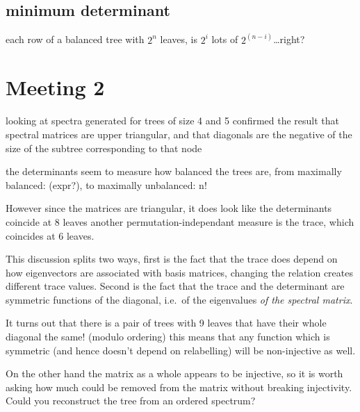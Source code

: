 \documentclass{report}
\begin{document}
\subsection{minimum determinant}

each row of a balanced tree with $2^n$ leaves, is $2^i$ lots of $2^(n-i)$\ldots right?

\section{Meeting 2}


looking at spectra generated for trees of size 4 and 5 confirmed the result
that spectral matrices are upper triangular, and that diagonals are the
negative of the size of the subtree corresponding to that node

the determinants seem to measure how balanced the trees are, from maximally
balanced: (expr?), to maximally unbalanced: n!


However since the matrices are triangular, it does look like the determinants
coincide at 8 leaves
another permutation-independant measure is the trace, which coincides at 6
leaves.

This discussion splits two ways, first is the fact that the trace does depend
on how eigenvectors are associated with basis matrices, changing the relation
creates different trace values.
Second is the fact that the trace and the determinant are symmetric functions
of the diagonal, i.e.\ of the eigenvalues \emph{of the spectral matrix}.

It turns out that there is a pair of trees with 9 leaves that have their whole
diagonal the same! (modulo ordering)
this means that any function which is symmetric (and hence doesn't depend on
relabelling) will be non-injective as well.

On the other hand the matrix as a whole appears to be injective, so it is worth
asking how much could be removed from the matrix without breaking injectivity.
Could you reconstruct the tree from an ordered spectrum?
\end{document}
